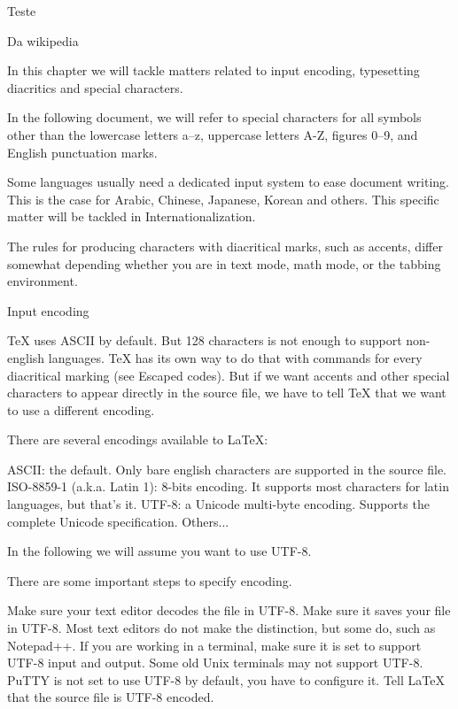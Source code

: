 \documentclass{article}
\begin{document}





Teste 




Da wikipedia

In this chapter we will tackle matters related to input encoding, typesetting diacritics and special characters.

In the following document, we will refer to special characters for all symbols other than the lowercase letters a–z, uppercase letters A-Z, figures 0–9, and English punctuation marks.

Some languages usually need a dedicated input system to ease document writing. This is the case for Arabic, Chinese, Japanese, Korean and others. This specific matter will be tackled in Internationalization.

The rules for producing characters with diacritical marks, such as accents, differ somewhat depending whether you are in text mode, math mode, or the tabbing environment.



Input encoding

TeX uses ASCII by default. But 128 characters is not enough to support non-english languages. TeX has its own way to do that with commands for every diacritical marking (see Escaped codes). But if we want accents and other special characters to appear directly in the source file, we have to tell TeX that we want to use a different encoding.

There are several encodings available to LaTeX:

    ASCII: the default. Only bare english characters are supported in the source file.
    ISO-8859-1 (a.k.a. Latin 1): 8-bits encoding. It supports most characters for latin languages, but that's it.
    UTF-8: a Unicode multi-byte encoding. Supports the complete Unicode specification.
    Others...

In the following we will assume you want to use UTF-8.

There are some important steps to specify encoding.

    Make sure your text editor decodes the file in UTF-8.
    Make sure it saves your file in UTF-8. Most text editors do not make the distinction, but some do, such as Notepad++.
    If you are working in a terminal, make sure it is set to support UTF-8 input and output. Some old Unix terminals may not support UTF-8. PuTTY is not set to use UTF-8 by default, you have to configure it.
    Tell LaTeX that the source file is UTF-8 encoded.
    
\end{document}
